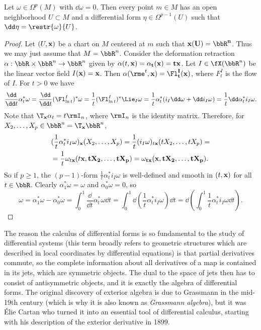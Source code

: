 \begin{thm}\label{lem poincare classic}
    Let $\omega\in\Omega^p(M)$ with $\dd\omega=0$. Then every point $m\in M$ has an open neighborhood $U\subset M$ and a differential form $\eta\in\Omega^{p-1}(U)$ such that $\dd\eta=\restr{\omega}{U}$.
\end{thm}
\begin{proof}
    Let $(U,\bf{x})$ be a chart on $M$ centered at $m$ such that $\bf{x}(U)=\bbR^n$. Thus we may just assume that $M=\bbR^n$. Consider the deformation retraction $\alpha:\bbR\times\bbR^n\to \bbR^n$ given by $\alpha(t,\bf{x})=\alpha_t(\bf{x})=t\bf{x}$. Let $I\in \fX(\bbR^n)$ be the linear vector field $I(\bf{x})=\bf{x}$. Then $\alpha(\rme^t,\bf{x})=\Fl^I_t(\bf{x})$, where $F^I_t$ is the flow of $I$. For $t>0$ we have 
    \[\frac{\dd}{\dd t}\alpha_t^\ast\omega=\frac{\dd}{\dd t}(\Fl^I_{\ln t})^\ast\omega=\frac{1}{t}(\Fl^I_{\ln t})^\ast \Lie_{I}\omega=\frac{1}{t}\alpha_t^\ast(i_{I}\dd\omega+\dd i_{I}\omega)=\frac{1}{t}\dd\alpha_t^\ast i_{I}\omega.\]
    Note that $\T_{\bf{x}}\alpha_t=t\rmI_n$, where $\rmI_n$ is the identity matrix. Therefore, for $X_2,\ldots,X_p\in \bbR^n=\T_{\bf{x}}\bbR^n$,
    \begin{multline}
        (\frac{1}{t}\alpha_t^\ast i_{I}\omega)_{\bf{x}}(X_2,\ldots,X_p)=\frac{1}{t}(i_I\omega)_{t\bf{x}}(tX_2,\ldots,tX_p)=\\
        =\frac{1}{t}\omega_{t\bf{x}}(t\bf{x},tX_2,\ldots,tX_p)=\omega_{t\bf{x}}(\bf{x},tX_2,\ldots,tX_p).
    \end{multline}
    So if $p\geq 1$, the $(p-1)$-form $\frac{1}{t}\alpha^\ast_t i_I\omega$ is well-defined and smooth in $(t,\bf{x})$ for all $t\in\bbR$. Clearly $\alpha^\ast_1\omega=\omega$ and $\alpha^\ast_0\omega=0$, so 
    \[\omega=\alpha_1^\ast\omega-\alpha^\ast_0\omega=\int_0^1\frac{\dd}{\dd t}\alpha_t^\ast\omega\dd t=\int_0^1\dd \left(\frac{1}{t}\alpha_t^\ast i_I\omega\right)\dd t=\dd \left(\int_0^1\frac{1}{t}\alpha_t^\ast i_I\omega\dd t\right).\]
\end{proof}

\begin{rem}
    The reason the calculus of differential forms is so fundamental to the study of differential systems (this term broadly refers to geometric structures which are described in local coordinates by differential equations) is that partial derivatives commute, so the complete information about all derivatives of a map is contained in its jets, which are symmetric objects. The dual to the space of jets then has to consist of antisymmetric objects, and it is exactly the algebra of differential forms. The original discovery of exterior algebra is due to Grassmann in the mid-19th century (which is why it is also known as \emph{Grassmann algebra}), but it was \'Elie Cartan who turned it into an essential tool of differential calculus, starting with his description of the exterior derivative in 1899.
\end{rem}


